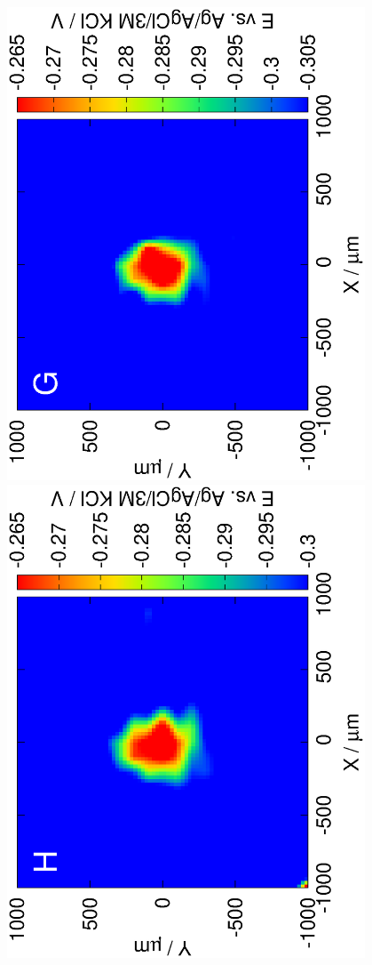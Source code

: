 \documentclass{beamer}
\begin{document}
\begin{frame}
\begin{columns}[T]
\begin{column}{.2\textwidth}
\includegraphics[trim = 10mm 30mm 0mm 10mm, clip, width=0.8\textwidth, angle=-90]{13121315_deconvoluted.eps}\\
\includegraphics[trim = 10mm 30mm 0mm 10mm, clip, width=0.8\textwidth, angle=-90]{13121316_deconvoluted.eps}\\

\end{column}
\end{columns}
\end{frame}
\end{document}
